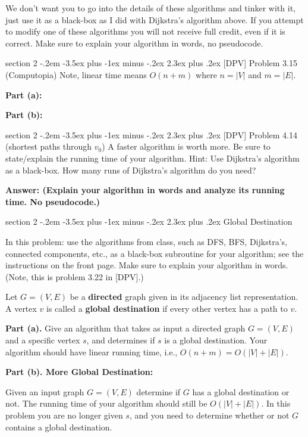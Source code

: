 \documentclass{article}
\makeatletter
\newenvironment{problem}{\@startsection
       {section}
       {2}
       {-.2em}
       {-3.5ex plus -1ex minus -.2ex}
       {2.3ex plus .2ex}
       {\pagebreak[3]%
       \large\bf\noindent{Problem }
       }
       }
\makeatother
\begin{document}
We don't want you to go into the details of these algorithms and tinker with it, just
use it as a black-box as I did with Dijkstra's algorithm above.
If you attempt to modify 
one of these algorithms you will not receive full credit, even if it is correct.
Make sure to explain your algorithm in words, no pseudocode.  


\newpage


\begin{problem} {[DPV] Problem 3.15 (Computopia)}
Note, linear time means $O(n+m)$ where $n=|V|$ and $m=|E|$.

\noindent \textbf{Part (a):}

\vspace{4in}

\noindent \textbf{Part (b):}

\end{problem}

\newpage
\begin{problem} {[DPV] Problem 4.14  (shortest paths through $v_0$)}
A faster algorithm is worth more.  Be sure to state/explain the running time of your algorithm.  
Hint: Use Dijkstra's algorithm as a black-box.  How many runs of Dijkstra's algorithm do you need?

\textbf{Answer:  (Explain your algorithm in words and analyze its running time.  No pseudocode.)}
	
\end{problem}

\newpage
\begin{problem} {Global Destination}

In this problem: use the algorithms from class, such as DFS, BFS, Dijkstra's, connected components, etc., as a
black-box subroutine for your algorithm; see the instructions on the front page.
Make sure to explain your algorithm in words.  (Note, this is problem 3.22 in [DPV].)

\smallskip

Let $G=(V,E)$ be a {\bf directed} graph given in its adjacency list
representation. A vertex $v$ is called a {\bf global destination}
if every other vertex has a path to $v$.

\smallskip

{\bf Part (a).}
Give an algorithm that takes as input a directed graph $G=(V,E)$
and a specific vertex $s$, and determines if $s$ is a global destination.
Your algorithm should have linear running time, i.e., $O(n+m) = O(|V|+|E|)$.

\vspace{4in}


{\bf Part (b). More Global Destination:}

Given an input graph $G=(V,E)$ determine if $G$ has a global destination or not.
The running time of your algorithm should still be $O(|V|+|E|)$.
In this problem you are no longer given $s$, and you need to determine
whether or not $G$ contains a global destination.

\end{problem}
\end{document}
